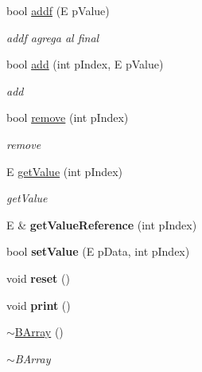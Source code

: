 \begin{DoxyCompactItemize}
bool \hyperlink{classBArray_a549423a3f30f2a4f4e4f6cac41ee56d8}{addf} (E p\-Value)
\begin{DoxyCompactList}\small\item\em addf agrega al final \end{DoxyCompactList}\item 
bool \hyperlink{classBArray_ad20e82b48673552d493a54e343c165cb}{add} (int p\-Index, E p\-Value)
\begin{DoxyCompactList}\small\item\em add \end{DoxyCompactList}\item 
bool \hyperlink{classBArray_abc72fc4dd6cca413d42a0cab8471ac44}{remove} (int p\-Index)
\begin{DoxyCompactList}\small\item\em remove \end{DoxyCompactList}\item 
E \hyperlink{classBArray_a9ae6755086524e16eb0a6ae4490472bb}{get\-Value} (int p\-Index)
\begin{DoxyCompactList}\small\item\em get\-Value \end{DoxyCompactList}\item 
\hypertarget{classBArray_ab95faafde5cd5847c9cdde2077988415}{E \& {\bfseries get\-Value\-Reference} (int p\-Index)}\label{classBArray_ab95faafde5cd5847c9cdde2077988415}

\item 
\hypertarget{classBArray_a8a035cb596ed2b140d85147579024a8b}{bool {\bfseries set\-Value} (E p\-Data, int p\-Index)}\label{classBArray_a8a035cb596ed2b140d85147579024a8b}

\item 
\hypertarget{classBArray_a1851694345fd6a51557fb699b79f76f6}{void {\bfseries reset} ()}\label{classBArray_a1851694345fd6a51557fb699b79f76f6}

\item 
\hypertarget{classBArray_a2773a0b562a8f98ab11f0e1aeaee8793}{void {\bfseries print} ()}\label{classBArray_a2773a0b562a8f98ab11f0e1aeaee8793}

\item 
\hypertarget{classBArray_a06042b7d093d10621aa80cf4af3ea117}{\hyperlink{classBArray_a06042b7d093d10621aa80cf4af3ea117}{$\sim$\-B\-Array} ()}\label{classBArray_a06042b7d093d10621aa80cf4af3ea117}

\begin{DoxyCompactList}\small\item\em $\sim$\-B\-Array \end{DoxyCompactList}\end{DoxyCompactItemize}


